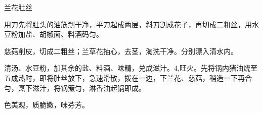 \begin{recipe}{兰花肚丝}

\ingredients


\cooking

\step 用刀先将肚头的油筋剽干净，平刀起成两层，斜刀割成花子，再切成二粗丝，用水豆粉加盐、胡椒面、料酒码匀。

\step 慈菇削皮，切成二粗丝；兰草花抽心，去茎，淘洗干净。分别漂入清水内。

\step 清汤、水豆粉，加其余的盐、料酒、味精，兑成滋汁。4,旺火。先将锅内猪油烧至五成热时，即将肚丝放下，急速滑散，拨在一边，下兰花、慈菇，稍造一下再合勻，烹下滋汁，将锅簸匀，淋香油起锅即成。

\notes

色美观，质脆嫩，味芬芳。

\end{recipe}

